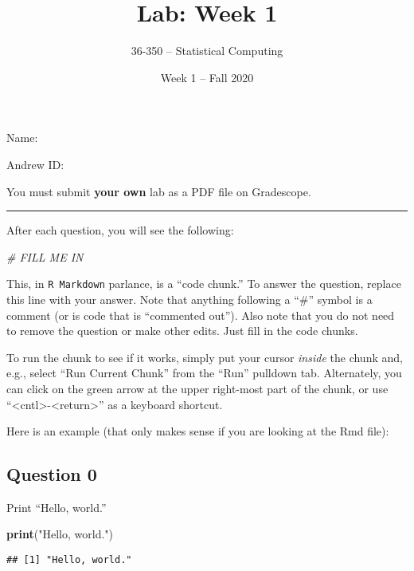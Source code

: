 \documentclass[
]{article}
\title{Lab: Week 1}
\author{36-350 -- Statistical Computing}
\date{Week 1 -- Fall 2020}
\newenvironment{Shaded}{\begin{snugshade}}{\end{snugshade}}
\newcommand{\CommentTok}[1]{\textcolor[rgb]{0.56,0.35,0.01}{\textit{#1}}}
\newcommand{\KeywordTok}[1]{\textcolor[rgb]{0.13,0.29,0.53}{\textbf{#1}}}
\newcommand{\NormalTok}[1]{#1}
\newcommand{\StringTok}[1]{\textcolor[rgb]{0.31,0.60,0.02}{#1}}
\begin{document}
\maketitle

Name:

Andrew ID:

You must submit \textbf{your own} lab as a PDF file on Gradescope.

\begin{center}\rule{0.5\linewidth}{0.5pt}\end{center}

After each question, you will see the following:

\begin{Shaded}
\begin{Highlighting}[]
\CommentTok{# FILL ME IN}
\end{Highlighting}
\end{Shaded}

This, in \texttt{R\ Markdown} parlance, is a ``code chunk.'' To answer
the question, replace this line with your answer. Note that anything
following a ``\#'' symbol is a comment (or is code that is ``commented
out''). Also note that you do not need to remove the question or make
other edits. Just fill in the code chunks.

To run the chunk to see if it works, simply put your cursor
\emph{inside} the chunk and, e.g., select ``Run Current Chunk'' from the
``Run'' pulldown tab. Alternately, you can click on the green arrow at
the upper right-most part of the chunk, or use
``\textless cntl\textgreater-\textless return\textgreater{}'' as a
keyboard shortcut.

Here is an example (that only makes sense if you are looking at the Rmd
file):

\hypertarget{question-0}{%
\subsection{Question 0}\label{question-0}}

Print ``Hello, world.''

\begin{Shaded}
\begin{Highlighting}[]
\KeywordTok{print}\NormalTok{(}\StringTok{"Hello, world."}\NormalTok{)}
\end{Highlighting}
\end{Shaded}

\begin{verbatim}
## [1] "Hello, world."
\end{verbatim}
\end{document}

